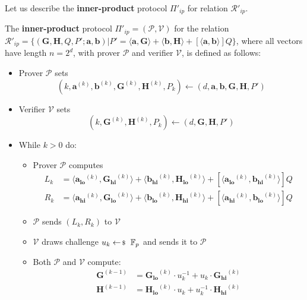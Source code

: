 \documentclass[../../book.tex]{subfiles}
\begin{document}
Let us describe the \textbf{inner-product} protocol $\Pi'_{ip}$ for relation $\mathcal{R}'_{ip}$. 
\begin{definition}
    The \textbf{inner-product} protocol $\Pi'_{ip} = (\mathcal{P}, \mathcal{V})$ for the relation $\mathcal{R}'_{ip} = \{ (\mathbf{G,H}, Q, P'; \mathbf{a,b}) \vert P' = \langle \mathbf{a,G} \rangle + \langle \mathbf{b,H} \rangle + [\langle \mathbf{a,b} \rangle]Q \}$, where all vectors have length $n=2^d$, with prover $\mathcal{P}$ and verifier $\mathcal{V}$, is defined as follows:
    \begin{itemize}
        \item Prover $\mathcal{P}$ sets $$(k, \mathbf{a}^{(k)}, \mathbf{b}^{(k)}, \mathbf{G}^{(k)}, \mathbf{H}^{(k)}, P_k) \gets (d, \mathbf{a,b,G,H},P')$$
        \item Verifier $\mathcal{V}$ sets $$(k, \mathbf{G}^{(k)}, \mathbf{H}^{(k)}, P_k) \gets (d, \mathbf{G,H},P')$$
        \item While $k > 0$ do:
            \begin{itemize}
                \item Prover $\mathcal{P}$ computes 
                    \begin{align*}
                        L_{k} &= \langle \mathbf{a_{lo}}^{(k)}, \mathbf{G_{hi}}^{(k)}\rangle + \langle \mathbf{b_{hi}}^{(k)}, \mathbf{H_{lo}}^{(k)}\rangle + [\langle \mathbf{a_{lo}}^{(k)}, \mathbf{b_{hi}}^{(k)}\rangle]Q \\
                        R_{k} &= \langle \mathbf{a_{hi}}^{(k)}, \mathbf{G_{lo}}^{(k)}\rangle + \langle \mathbf{b_{lo}}^{(k)}, \mathbf{H_{hi}}^{(k)}\rangle + [\langle \mathbf{a_{hi}}^{(k)}, \mathbf{b_{lo}}^{(k)}\rangle]Q
                    \end{align*}
                \item $\mathcal{P}$ sends $(L_k, R_k)$ to $\mathcal{V}$
                \item $\mathcal{V}$ draws challenge $u_k \leftarrowS \mathbb{F}_p$ and sends it to $\mathcal{P}$
                \item Both $\mathcal{P}$ and $\mathcal{V}$ compute:
                    \begin{align*}
                        \mathbf{G}^{(k-1)} &= \mathbf{G_{lo}}^{(k)} \cdot u_k^{-1} + u_k \cdot \mathbf{G_{hi}}^{(k)} \\
                        \mathbf{H}^{(k-1)} &= \mathbf{H_{lo}}^{(k)} \cdot u_k + u_k^{-1} \cdot \mathbf{H_{hi}}^{(k)}
                    \end{align*}

\end{itemize}
\end{itemize}
\end{definition}
\end{document}
